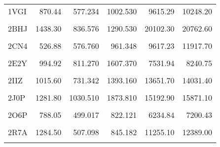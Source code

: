 \begin{table}[t!]
{\begin{tabular}{lrrrrr}
				1VGI & 870.44 & 577.234 & 1002.530 & 9615.29 & 10248.20\\
				\cellcolor{gray!6}{1ZVI} & \cellcolor{gray!6}{1435.90} & \cellcolor{gray!6}{701.091} & \cellcolor{gray!6}{1129.540} & \cellcolor{gray!6}{19918.60} & \cellcolor{gray!6}{20968.20}\\
				\addlinespace
				2BHJ & 1438.30 & 836.576 & 1290.530 & 20102.30 & 20762.60\\
				\cellcolor{gray!6}{2CJ0} & \cellcolor{gray!6}{809.62} & \cellcolor{gray!6}{2653.180} & \cellcolor{gray!6}{4835.280} & \cellcolor{gray!6}{12749.60} & \cellcolor{gray!6}{12892.20}\\
				2CN4 & 526.88 & 576.760 & 961.348 & 9617.23 & 11917.70\\
				\cellcolor{gray!6}{2CPO} & \cellcolor{gray!6}{886.17} & \cellcolor{gray!6}{1846.490} & \cellcolor{gray!6}{3329.540} & \cellcolor{gray!6}{13081.60} & \cellcolor{gray!6}{12995.60}\\
				2E2Y & 994.92 & 811.270 & 1607.370 & 7531.94 & 8240.75\\
				\addlinespace
				\cellcolor{gray!6}{2FC2} & \cellcolor{gray!6}{1091.40} & \cellcolor{gray!6}{1011.190} & \cellcolor{gray!6}{1669.900} & \cellcolor{gray!6}{18383.50} & \cellcolor{gray!6}{18552.10}\\
				2IIZ & 1015.60 & 731.342 & 1393.160 & 13651.70 & 14031.40\\
				\cellcolor{gray!6}{2IPS} & \cellcolor{gray!6}{1242.40} & \cellcolor{gray!6}{618.252} & \cellcolor{gray!6}{1075.560} & \cellcolor{gray!6}{27760.50} & \cellcolor{gray!6}{25814.10}\\
				2J0P & 1281.80 & 1030.510 & 1873.810 & 15192.90 & 15871.10\\
				\cellcolor{gray!6}{2J18} & \cellcolor{gray!6}{841.67} & \cellcolor{gray!6}{1962.990} & \cellcolor{gray!6}{3556.340} & \cellcolor{gray!6}{12675.10} & \cellcolor{gray!6}{12779.00}\\
				\addlinespace
				2O6P & 788.05 & 499.017 & 822.121 & 6234.84 & 7200.43\\
				\cellcolor{gray!6}{2Q6N} & \cellcolor{gray!6}{1030.10} & \cellcolor{gray!6}{644.365} & \cellcolor{gray!6}{1040.080} & \cellcolor{gray!6}{20051.10} & \cellcolor{gray!6}{19747.50}\\
				2R7A & 1284.50 & 507.098 & 845.182 & 11255.10 & 12389.00\\
				\cellcolor{gray!6}{2SPL} & \cellcolor{gray!6}{1055.70} & \cellcolor{gray!6}{589.706} & \cellcolor{gray!6}{1029.660} & \cellcolor{gray!6}{7588.36} & \cellcolor{gray!6}{8105.94}\\

\end{tabular}}
\end{table}
